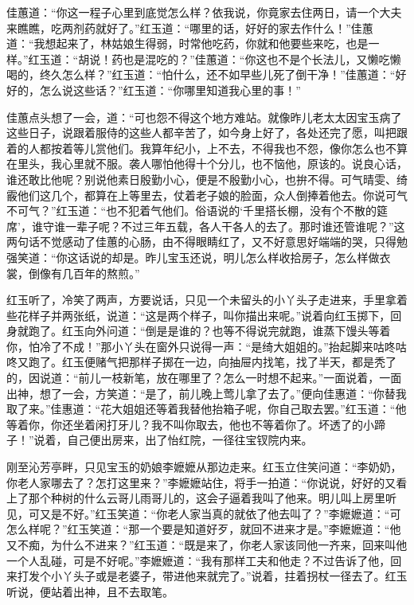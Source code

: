 \documentclass[12pt,oneside]{book}
\begin{document}
佳蕙道：“你这一程子心里到底觉怎么样？依我说，你竟家去住两日，请一个大夫来瞧瞧，吃两剂药就好了。”红玉道：“哪里的话，好好的家去作什么！”佳蕙道：“我想起来了，林姑娘生得弱，时常他吃药，你就和他要些来吃，也是一样。”红玉道：“胡说！药也是混吃的？”佳蕙道：“你这也不是个长法儿，又懒吃懒喝的，终久怎么样？”红玉道：“怕什么，还不如早些儿死了倒干净！”佳蕙道：“好好的，怎么说这些话？”红玉道：“你哪里知道我心里的事！”

佳蕙点头想了一会，道：“可也怨不得这个地方难站。就像昨儿老太太因宝玉病了这些日子，说跟着服侍的这些人都辛苦了，如今身上好了，各处还完了愿，叫把跟着的人都按着等儿赏他们。我算年纪小，上不去，不得我也不怨，像你怎么也不算在里头，我心里就不服。袭人哪怕他得十个分儿，也不恼他，原该的。说良心话，谁还敢比他呢？别说他素日殷勤小心，便是不殷勤小心，也拚不得。可气晴雯、绮霰他们这几个，都算在上等里去，仗着老子娘的脸面，众人倒捧着他去。你说可气不可气？”红玉道：“也不犯着气他们。俗语说的‘千里搭长棚，没有个不散的筵席’，谁守谁一辈子呢？不过三年五载，各人干各人的去了。那时谁还管谁呢？”这两句话不觉感动了佳蕙的心肠，由不得眼睛红了，又不好意思好端端的哭，只得勉强笑道：“你这话说的却是。昨儿宝玉还说，明儿怎么样收拾房子，怎么样做衣裳，倒像有几百年的熬煎。”

红玉听了，冷笑了两声，方要说话，只见一个未留头的小丫头子走进来，手里拿着些花样子并两张纸，说道：“这是两个样子，叫你描出来呢。”说着向红玉掷下，回身就跑了。红玉向外问道：“倒是是谁的？也等不得说完就跑，谁蒸下馒头等着你，怕冷了不成！”那小丫头在窗外只说得一声：“是绮大姐姐的。”抬起脚来咕咚咕咚又跑了。红玉便赌气把那样子掷在一边，向抽屉内找笔，找了半天，都是秃了的，因说道：“前儿一枝新笔，放在哪里了？怎么一时想不起来。”一面说着，一面出神，想了一会，方笑道：“是了，前儿晚上莺儿拿了去了。”便向佳惠道：“你替我取了来。”佳惠道：“花大姐姐还等着我替他抬箱子呢，你自己取去罢。”红玉道：“他等着你，你还坐着闲打牙儿？我不叫你取去，他也不等着你了。坏透了的小蹄子！”说着，自己便出房来，出了怡红院，一径往宝钗院内来。

刚至沁芳亭畔，只见宝玉的奶娘李嬷嬷从那边走来。红玉立住笑问道：“李奶奶，你老人家哪去了？怎打这里来？”李嬷嬷站住，将手一拍道：“你说说，好好的又看上了那个种树的什么云哥儿雨哥儿的，这会子逼着我叫了他来。明儿叫上房里听见，可又是不好。”红玉笑道：“你老人家当真的就依了他去叫了？”李嬷嬷道：“可怎么样呢？”红玉笑道：“那一个要是知道好歹，就回不进来才是。”李嬷嬷道：“他又不痴，为什么不进来？”红玉道：“既是来了，你老人家该同他一齐来，回来叫他一个人乱碰，可是不好呢。”李嬷嬷道：“我有那样工夫和他走？不过告诉了他，回来打发个小丫头子或是老婆子，带进他来就完了。”说着，拄着拐杖一径去了。红玉听说，便站着出神，且不去取笔。
\end{document}
